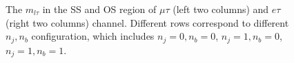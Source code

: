 \begin{figure}
    
    
    
    
    

    \caption{The $m_{l\tau}$ in the SS and OS region of $\mu\tau$ (left two columns) and $e\tau$ (right two columns) 
    channel. Different rows correspond to different $n_j,n_b$ configuration, which includes
    $n_j=0,n_b=0$, $n_j=1,n_b=0$, $n_j=1,n_b=1$. 
    }
    \label{fig:appendix:qcdsf:ltau}
\end{figure}



